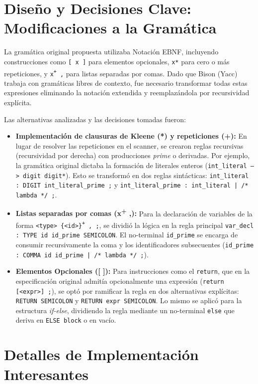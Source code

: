 \documentclass[11pt, a4paper]{article}
\begin{document}
\section{Diseño y Decisiones Clave: Modificaciones a la Gramática}
La gramática original propuesta utilizaba Notación EBNF, incluyendo construcciones como \texttt{[ x ]} para elementos opcionales, \texttt{x*} para cero o más repeticiones, y \texttt{x\textsuperscript{+} ,} para listas separadas por comas. Dado que Bison (Yacc) trabaja con gramáticas libres de contexto, fue necesario transformar todas estas expresiones eliminando la notación extendida y reemplazándola por recursividad explícita.

Las alternativas analizadas y las decisiones tomadas fueron:

\begin{itemize}
    \item \textbf{Implementación de clausuras de Kleene (*) y repeticiones (+):} En lugar de resolver las repeticiones en el scanner, se crearon reglas recursivas (recursividad por derecha) con producciones \textit{prime} o derivadas. Por ejemplo, la gramática original dictaba la formación de literales enteros (\texttt{int\_literal --> digit digit*}). Esto se transformó en dos reglas sintácticas: \texttt{int\_literal : DIGIT int\_literal\_prime ;} y \texttt{int\_literal\_prime : int\_literal | /* lambda */ ;}.
    
    \item \textbf{Listas separadas por comas (x\textsuperscript{+} ,):} Para la declaración de variables de la forma \texttt{<type> \{<id>\}\textsuperscript{+} , ;}, se dividió la lógica en la regla principal \texttt{var\_decl : TYPE id id\_prime SEMICOLON}. El no-terminal \texttt{id\_prime} se encarga de consumir recursivamente la coma y los identificadores subsecuentes (\texttt{id\_prime : COMMA id id\_prime | /* lambda */ ;}).
    
    \item \textbf{Elementos Opcionales ([ ]):} Para instrucciones como el \texttt{return}, que en la especificación original admitía opcionalmente una expresión (\texttt{return [<expr>] ;}), se optó por ramificar la regla en dos alternativas explícitas: \texttt{RETURN SEMICOLON} y \texttt{RETURN expr SEMICOLON}. Lo mismo se aplicó para la estructura \textit{if-else}, dividiendo la regla mediante un no-terminal \texttt{else} que deriva en \texttt{ELSE block} o en vacío.
\end{itemize}

\section{Detalles de Implementación Interesantes}
\end{document}

